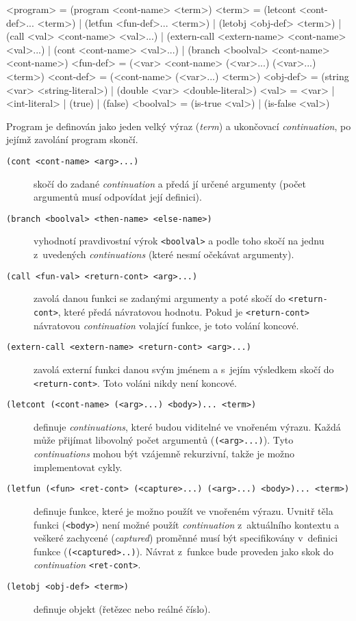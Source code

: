 \begin{gram}
<program>   = (program <cont-name> <term>)
<term>      = (letcont <cont-def>... <term>)
            | (letfun <fun-def>... <term>)
            | (letobj <obj-def> <term>)
            | (call <val> <cont-name> <val>...)
            | (extern-call <extern-name> <cont-name> <val>...)
            | (cont <cont-name> <val>...)
            | (branch <boolval> <cont-name> <cont-name>)
<fun-def>   = (<var> <cont-name> (<var>...) (<var>...) <term>)
<cont-def>  = (<cont-name> (<var>...) <term>)
<obj-def>   = (string <var> <string-literal>)
            | (double <var> <double-literal>)
<val>       = <var> | <int-literal> | (true) | (false)
<boolval>   = (is-true <val>) | (is-false <val>)
\end{gram}


Program je definován jako jeden velký výraz (\emph{term}) a ukončovací
\emph{continuation}, po jejímž zavolání program skončí.

\begin{description}
\item[\texttt{(cont <cont-name> <arg>...)}] skočí do zadané \emph{continuation}
  a předá jí určené argumenty (počet argumentů musí odpovídat její definici).

\item[\texttt{(branch <boolval> <then-name> <else-name>)}] vyhodnotí
  pravdivostní výrok \texttt{<boolval>} a podle toho skočí na jednu z~uvedených
  \emph{continuations} (které nesmí očekávat argumenty).

\item[\texttt{(call <fun-val> <return-cont> <arg>...)}] zavolá danou funkci se
  zadanými argumenty a poté skočí do \texttt{<return-cont>}, které předá
  návratovou hodnotu. Pokud je \texttt{<return-cont>} návratovou
  \emph{continuation} volající funkce, je toto volání koncové.

\item[\texttt{(extern-call <extern-name> <return-cont> <arg>...)}] zavolá
  externí funkci danou svým jménem a s~jejím výsledkem skočí do
  \texttt{<return-cont>}. Toto voláni nikdy není koncové.

\item[\texttt{(letcont (<cont-name> (<arg>...) <body>)... <term>)}] definuje
  \emph{continuations}, které budou viditelné ve vnořeném výrazu. Každá může
  přijímat libovolný počet argumentů (\texttt{(<arg>...)}). Tyto
  \emph{continuations} mohou být vzájemně rekurzivní, takže je možno
  implementovat cykly.

\item[\texttt{(letfun (<fun> <ret-cont> (<capture>...) (<arg>...) <body>)...
  <term>)}] definuje funkce, které je možno použít ve vnořeném výrazu. Uvnitř
  těla funkci (\texttt{<body>}) není možné použít \emph{continuation}
  z~aktuálního kontextu a veškeré zachycené (\emph{captured}) proměnné musí být
  specifikovány v~definici funkce (\texttt{(<captured>..)}). Návrat z~funkce
  bude proveden jako skok do \emph{continuation} \texttt{<ret-cont>}.

\item[\texttt{(letobj <obj-def> <term>)}] definuje objekt (řetězec nebo
  reálné číslo).
\end{description}

